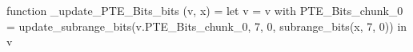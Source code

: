 function _update_PTE_Bits_bits (v, x) = let v = { v with PTE_Bits_chunk_0 = update_subrange_bits(v.PTE_Bits_chunk_0, 7, 0, subrange_bits(x, 7, 0)) } in
  v
